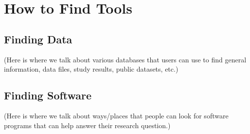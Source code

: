\chapter{How to Find Tools}
\section{Finding Data}
(Here is where we talk about various databases that users can use to find general information, data files, study results, public datasets, etc.)
\section{Finding Software}
(Here is where we talk about ways/places that people can look for software programs that can help answer their research question.)
